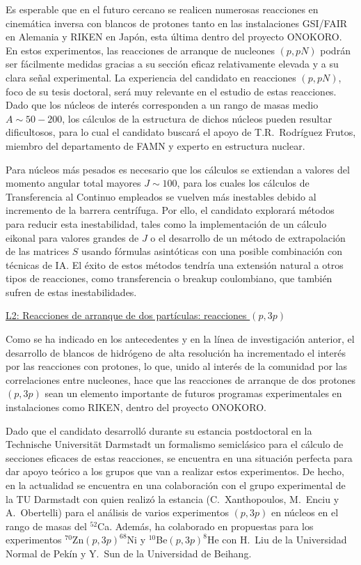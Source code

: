 \documentclass[a4paper,12pt,twoside]{article}
\begin{document}
Es esperable que en el futuro cercano se realicen numerosas reacciones en cinemática inversa con blancos de protones tanto en las instalaciones GSI/FAIR en Alemania y RIKEN en Japón, esta última dentro del proyecto ONOKORO\cite{r3b24,onokoro}. En estos experimentos, las reacciones de arranque de nucleones $(p,pN)$ podrán ser fácilmente medidas gracias a su sección eficaz relativamente elevada y a su clara señal experimental. La experiencia del candidato en reacciones $(p,pN)$, foco de su tesis doctoral, será muy relevante en el estudio de estas reacciones. Dado que los núcleos de interés corresponden a un rango de masas medio $A\sim 50-200$, los cálculos de la estructura de dichos núcleos pueden resultar dificultosos, para lo cual el candidato buscará el apoyo de T.R.~Rodríguez Frutos, miembro del departamento de FAMN y experto en estructura nuclear.

Para núcleos más pesados es necesario que los cálculos se extiendan a valores del momento angular total mayores $J\sim 100$, para los cuales los cálculos de Transferencia al Continuo empleados se vuelven más inestables debido al incremento de la barrera centrífuga. Por ello, el candidato explorará métodos para reducir esta inestabilidad, tales como la implementación de un cálculo eikonal para valores grandes de $J$ o el desarrollo de un método de extrapolación de las matrices $S$ usando fórmulas asintóticas con una posible combinación con técnicas de IA. El éxito de estos métodos tendría una extensión natural a otros tipos de reacciones, como transferencia o breakup coulombiano, que también sufren de estas inestabilidades.

\underline{L2: Reacciones de arranque de dos partículas: reacciones $(p,3p)$}

Como se ha indicado en los antecedentes y en la línea de investigación anterior, el desarrollo de blancos de hidrógeno de alta resolución ha incrementado el interés por las reacciones con protones, lo que, unido al interés de la comunidad por las correlaciones entre nucleones, hace que las reacciones de arranque de dos protones $(p,3p)$ sean un elemento importante de futuros programas experimentales en instalaciones como RIKEN, dentro del proyecto ONOKORO\cite{onokoro}.

Dado que el candidato desarrolló durante su estancia postdoctoral en la Technische Universität Darmstadt un formalismo semiclásico para el cálculo de secciones eficaces de estas reacciones, se encuentra en una situación perfecta para dar apoyo teórico a los grupos que van a realizar estos experimentos. De hecho, en la actualidad se encuentra en una colaboración con el grupo experimental de la TU Darmstadt con quien realizó la estancia (C.~Xanthopoulos, M.~Enciu y A.~Obertelli) para el análisis de varios experimentos $(p,3p)$ en núcleos en el rango de masas del $^{52}$Ca. Además, ha colaborado en propuestas para los experimentos $^{70}$Zn$(p,3p)^{68}$Ni y $^{10}$Be$(p,3p)^8$He con H.~Liu de la Universidad Normal de Pekín y Y.~Sun de la Universidad de Beihang.
\end{document}
